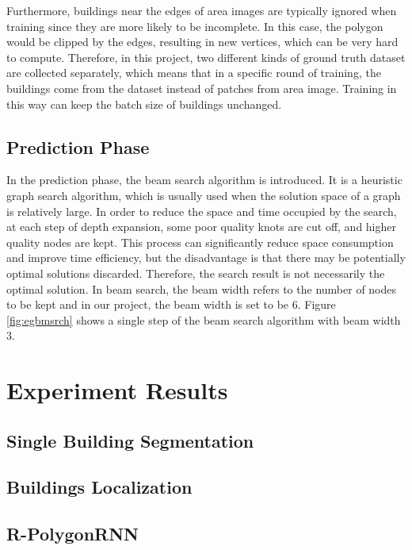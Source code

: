 Furthermore, buildings near the edges of area images are typically ignored when training since they are more likely to be incomplete. In this case, the polygon would be clipped by the edges, resulting in new vertices, which can be very hard to compute. Therefore, in this project, two different kinds of ground truth dataset are collected separately, which means that in a specific round of training, the buildings come from the dataset instead of patches from area image.  Training in this way can keep the batch size of buildings unchanged.

\subsection{Prediction Phase}\label{prdphs}

In the prediction phase, the beam search algorithm is introduced. It is a heuristic graph search algorithm, which is usually used when the solution space of a graph is relatively large. In order to reduce the space and time occupied by the search, at each step of depth expansion, some poor quality knots are cut off, and higher quality nodes are kept. This process can significantly reduce space consumption and improve time efficiency, but the disadvantage is that there may be potentially optimal solutions discarded. Therefore, the search result is not necessarily the optimal solution. In beam search, the beam width refers to the number of nodes to be kept and in our project, the beam width is set to be 6. Figure \ref{fig:egbmsrch} shows a single step of the beam search algorithm with beam width 3.



\section{Experiment Results}\label{expres}

\subsection{Single Building Segmentation}

\subsection{Buildings Localization}

\subsection{R-PolygonRNN}
